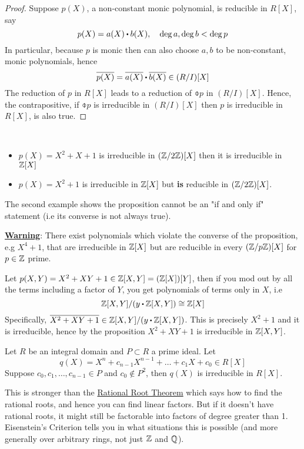 \documentclass[../Main.tex]{subfiles}
\begin{document}
\begin{proof}
	Suppose $p(X)$, a non-constant monic polynomial, is reducible in $R[X]$, say
	\[p(X)=a(X)\rdot b(X),\quad \deg a, \deg b< \deg p\]
	In particular, because $p$ is monic then can also choose $a,b$ to be non-constant, monic polynomials, hence
	\[\obar{p(X)} = \obar{a(X)}\rdot \obar{b(X)} \in (R/I)[X]\qedhere\]
	The reduction of $p$ in $R[X]$ leads to a reduction of $\obar{p}$ in $(R/I)[X]$. Hence, the contrapositive, if $\obar{p}$ is irreducible in $(R/I)[X]$ then $p$ is irreducible in $R[X]$, is also true.
\end{proof}
\begin{example}~
	\begin{itemize}
		\item $p(X)=X^2+X+1$ is irreducible in $(\mathbb{Z}/2\mathbb{Z})[X]$ then it is irreducible in $\mathbb{Z}[X]$
		\item $p(X)=X^2+1$ is irreducible in $\mathbb{Z}[X]$ but \textbf{is} reducible in $(\mathbb{Z}/2\mathbb{Z})[X]$.
	\end{itemize}
	The second example shows the proposition cannot be an "if and only if" statement (i.e its converse is not always true).
\end{example}
\textbf{\textcolor{BrickRed}{\underline{Warning}}}: There exist polynomials which violate the converse of the proposition, e.g $X^4+1$, that are irreducible in $\mathbb{Z}[X]$ but are reducible in every $(\mathbb{Z}/p\mathbb{Z})[X]$ for $p\in \mathbb{Z} $ prime.
\begin{example}
	Let $p(X,Y) = X^2+XY+1\in \mathbb{Z}[X,Y] = (\mathbb{Z}[X])[Y]$, then if you mod out by all the terms including a factor of $Y$, you get polynomials of terms only in $X$, i.e
	\[\Z[X,Y]/(y\rdot \Z[X,Y]) \cong \Z[X]\]
	Specifically, $\obar{X^2+XY+1} \in \Z[X,Y]/(y\rdot \Z[X,Y])$. This is precisely $X^2+1$ and it is irreducible, hence by the proposition $X^2+XY+1$ is irreducible in $\mathbb{Z}[X,Y]$.
\end{example}
\newpage
\begin{thm}[title= Eisenstein's Criterion,label=eisen]
	Let $R$ be an integral domain and $P\subset R$ a prime ideal. Let
	\[q(X)=X^n+c_{n-1}X^{n-1}+\dots+c_1X+c_0\in R[X]\]
	Suppose $c_0,c_1,\dots,c_{n-1}\in P$ and $c_0\notin P^2$, then $q(X)$ is irreducible in $R[X]$.
\end{thm}
This is stronger than the \hyperref[prop:rational]{Rational Root Theorem} which says how to find the rational roots, and hence you can find linear factors. But if it doesn't have rational roots, it might still be factorable into factors of degree greater than 1. Eisenstein's Criterion tells you in what situations this is possible (and more generally over arbitrary rings, not just $\mathbb{Z}$ and $\mathbb{Q}$).
\end{document}
